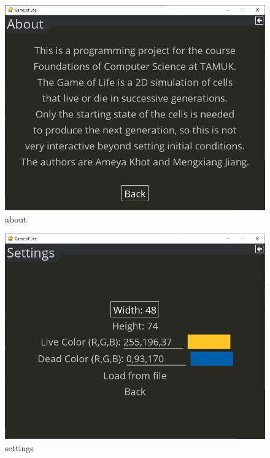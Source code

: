 \documentclass[12pt]{report}
\begin{document}
\begin{figure}[h]
    \centering
    \includegraphics[width=\textwidth]{about}
    \caption{about}
\end{figure}

\begin{figure}[h]
    \centering
    \includegraphics[width=\textwidth]{settings}
    \caption{settings}
\end{figure}
\end{document}
